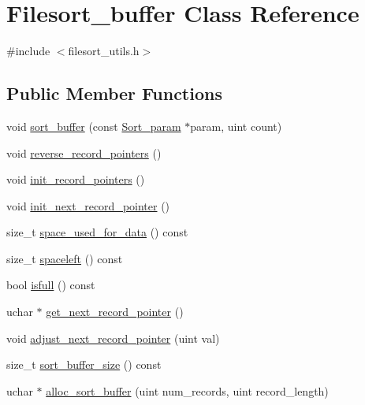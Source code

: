 \hypertarget{classFilesort__buffer}{}\section{Filesort\+\_\+buffer Class Reference}
\label{classFilesort__buffer}


{\ttfamily \#include $<$filesort\+\_\+utils.\+h$>$}

\subsection*{Public Member Functions}
\begin{DoxyCompactItemize}
\item 
void \mbox{\hyperlink{classFilesort__buffer_adb7d7a439a496d0ab703c193dced5e32}{sort\+\_\+buffer}} (const \mbox{\hyperlink{classSort__param}{Sort\+\_\+param}} $\ast$param, uint count)
\item 
void \mbox{\hyperlink{classFilesort__buffer_a7772b898cdbd3117acb45a59c9b79cf1}{reverse\+\_\+record\+\_\+pointers}} ()
\item 
void \mbox{\hyperlink{classFilesort__buffer_acde96dcd74d1e6594c7055196e316d35}{init\+\_\+record\+\_\+pointers}} ()
\item 
void \mbox{\hyperlink{classFilesort__buffer_a2154d7e1b6689811f69d7906a7b3d9dd}{init\+\_\+next\+\_\+record\+\_\+pointer}} ()
\item 
size\+\_\+t \mbox{\hyperlink{classFilesort__buffer_aa6530a61d921471327a2477d05e3d321}{space\+\_\+used\+\_\+for\+\_\+data}} () const
\item 
size\+\_\+t \mbox{\hyperlink{classFilesort__buffer_ad49ea9addecd96e260b3ad82b36b1739}{spaceleft}} () const
\item 
bool \mbox{\hyperlink{classFilesort__buffer_aecbe946a71096aab8e07249d318304f1}{isfull}} () const
\item 
uchar $\ast$ \mbox{\hyperlink{classFilesort__buffer_a4ab5d2686a9d85b333e9250015b32a1c}{get\+\_\+next\+\_\+record\+\_\+pointer}} ()
\item 
void \mbox{\hyperlink{classFilesort__buffer_a69e06f3b69cc78e6450de38e2508e208}{adjust\+\_\+next\+\_\+record\+\_\+pointer}} (uint val)
\item 
size\+\_\+t \mbox{\hyperlink{classFilesort__buffer_a65a2f7a974695eab8917c28cf82078f3}{sort\+\_\+buffer\+\_\+size}} () const
\item 
uchar $\ast$ \mbox{\hyperlink{classFilesort__buffer_a200aa06db9842f368384b0943d01c806}{alloc\+\_\+sort\+\_\+buffer}} (uint num\+\_\+records, uint record\+\_\+length)

\end{DoxyCompactItemize}
